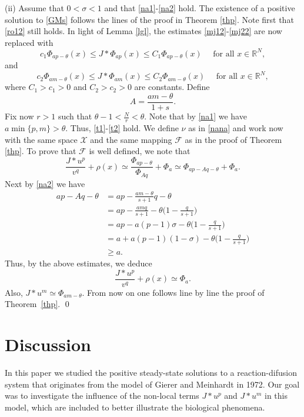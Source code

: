 \documentclass[leqno,12pt]{article}
\newcommand{\R}{\mathbb R}
\numberwithin{equation}{section}
\begin{document}
(ii) Assume that $0<\sigma<1$ and that \eqref{na1}-\eqref{na2} hold. The existence of a positive solution to \eqref{GMs} follows the lines of the proof in Theorem \ref{thp}. Note first that \eqref{ro12} still holds. In light of Lemma \ref{lgl}, the estimates \eqref{mj12}-\eqref{mj22} are now replaced with 
\begin{equation}\label{mja}
c_1\Phi_{ap-\theta}(x) \leq J*\Phi_{ap}(x)\leq C_1 \Phi_{ap-\theta}(x) \quad\mbox{ for all }x\in \R^N,
\end{equation}
and
\begin{equation}\label{mjb}
c_2\Phi_{am-\theta}(x) \leq J*\Phi_{am}(x)\leq C_2 \Phi_{am-\theta}(x) \quad\mbox{ for all }x\in \R^N,
\end{equation}
where $C_1>c_1>0$ and $C_2>c_2>0$ are constants.
Define
$$
A=\frac{am-\theta}{1+s}.
$$
Fix now $r>1$ such that $\theta-1<\frac{N}{r}<\theta$. Note that by \eqref{na1} we have $a\min\{p,m\}>\theta$. Thus, \eqref{t1}-\eqref{t2} hold. We define $\nu$ as in \eqref{nana} and work now with the same space $\mathscr{X}$ and the same mapping $\mathcal{F}$ as in the proof of Theorem \ref{thp}. 
To prove that $\mathcal{F}$ is well defined, we note that 
$$
\frac{J * u^p}{v^q}+\rho(x)\simeq \frac{\Phi_{ap-\theta}}{\Phi_{Aq}}+\Phi_{a}\simeq \Phi_{ap-Aq-\theta}+\Phi_{a}.
$$
Next by \eqref{na2} we have 
$$
\begin{aligned}
ap-Aq-\theta & =ap-\frac{am-\theta}{s+1}q-\theta\\
&=ap-\frac{amq}{s+1}-\theta\Big(1-\frac{q}{s+1}\Big)\\
&=ap-a(p-1)\sigma -\theta\Big(1-\frac{q}{s+1}\Big)\\
&=a+a(p-1)(1-\sigma)-\theta\Big(1-\frac{q}{s+1}\Big)\\
&\geq a.
\end{aligned}
$$
Thus, by the above estimates, we deduce
$$
\frac{J * u^p}{v^q}+\rho(x)\simeq \Phi_{a}.
$$
Also, $J*u^m\simeq \Phi_{am-\theta}$. From now on one follows line by line the proof of Theorem~\ref{thp}. \qed

\section{Discussion}

In this paper we studied the positive steady-state solutions to a reaction-difusion system that originates from the model of Gierer and Meinhardt \cite{GM72} in 1972. Our goal was to investigate the influence of the non-local terms $J*u^p$ and $J*u^m$ in this model, which are included to better illustrate the biological phenomena.  
\end{document}
